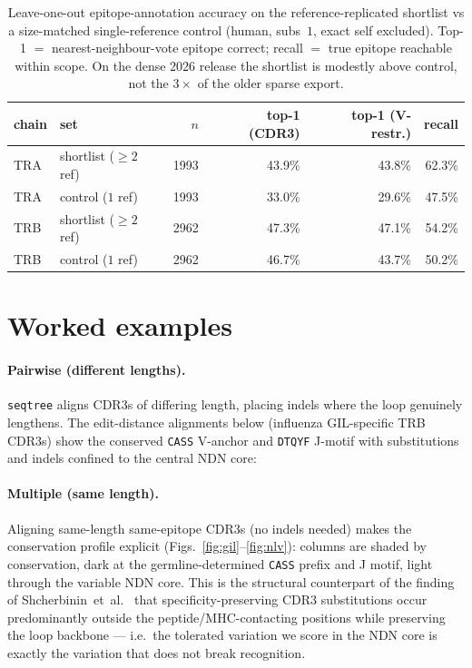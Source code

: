 \documentclass[11pt]{article}
\theoremstyle{oldplain}
\theoremstyle{oldrem}
\begin{document}
\begin{table}[ht]\centering\small
\begin{tabular}{llrrrr}
\hline
chain & set & $n$ & top-1 (CDR3) & top-1 (V-restr.) & recall\\
\hline
TRA & shortlist ($\ge2$ ref) & 1993 & 43.9\% & 43.8\% & 62.3\%\\
TRA & control ($1$ ref)      & 1993 & 33.0\% & 29.6\% & 47.5\%\\
TRB & shortlist ($\ge2$ ref) & 2962 & 47.3\% & 47.1\% & 54.2\%\\
TRB & control ($1$ ref)      & 2962 & 46.7\% & 43.7\% & 50.2\%\\
\hline
\end{tabular}
\caption{Leave-one-out epitope-annotation accuracy on the reference-replicated shortlist vs a
size-matched single-reference control (human, subs~$1$, exact self excluded). Top-1 $=$
nearest-neighbour-vote epitope correct; recall $=$ true epitope reachable within scope. On the dense
2026 release the shortlist is modestly above control, not the $3\times$ of the older sparse export.}
\label{tab:shortlist}
\end{table}

\section{Worked examples}
\paragraph{Pairwise (different lengths).} \texttt{seqtree} aligns CDR3s of differing length, placing
indels where the loop genuinely lengthens. The edit-distance alignments below (influenza GIL-specific
TRB CDR3s) show the conserved \texttt{CASS} V-anchor and \texttt{DTQYF} J-motif with substitutions and
indels confined to the central NDN core:
{\small{}}

\paragraph{Multiple (same length).} Aligning same-length same-epitope CDR3s (no indels needed) makes
the conservation profile explicit (Figs.~\ref{fig:gil}--\ref{fig:nlv}): columns are shaded by
conservation, dark at the germline-determined \texttt{CASS} prefix and J motif, light through the
variable NDN core. This is the structural counterpart of the finding of
Shcherbinin~et~al.~\cite{Shcherbinin2023} that specificity-preserving CDR3 substitutions occur
predominantly outside the peptide/MHC-contacting positions while preserving the loop backbone --- i.e.\
the tolerated variation we score in the NDN core is exactly the variation that does not break
recognition.
\end{document}
